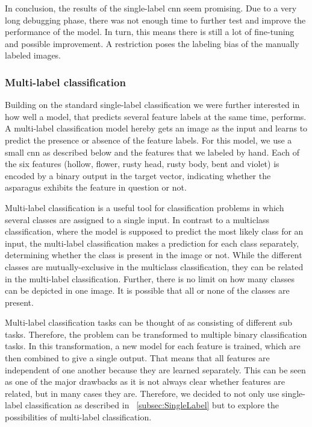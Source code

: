 \bigskip
In conclusion, the results of the single-label  \acrshort{cnn} seem promising. Due to a very long debugging phase, there was not enough time to further test and improve the performance of the model. In turn, this means there is still a lot of fine-tuning and possible improvement. A restriction poses the labeling bias of the manually labeled images.

\subsubsection{Multi-label classification}
\label{subsec:MultiLabel}

Building on the standard single-label classification we were further interested in how well a model, that predicts several feature labels at the same time, performs. A multi-label classification model hereby gets an image as the input and learns to predict the presence or absence of  the feature labels.
For this model, we use a small  \acrshort{cnn} as described below and the features that we labeled by hand. Each of the six features (hollow, flower, rusty head, rusty body, bent and violet) is encoded by a binary output in the target vector, indicating whether the asparagus exhibits the feature in question or not.

\bigskip
Multi-label classification is a useful tool for classification problems in which several classes are assigned to a single input. In contrast to a multiclass classification, where the model is supposed to predict the most likely class for an input, the multi-label classification makes a prediction for each class separately, determining whether the class is present in the image or not. While the different classes are mutually-exclusive in the multiclass classification, they can be related in the multi-label classification. Further, there is no limit on how many classes can be depicted in one image. It is possible that all or none of the classes are present.

Multi-label classification tasks can be thought of as consisting of different sub tasks. Therefore, the problem can be transformed to multiple binary classification tasks. In this transformation, a new model for each feature is trained, which are then combined to give a single output. That means that all features are independent of one another because they are learned separately. This can be seen as one of the major drawbacks as it is not always clear whether features are related, but in many cases they are.
Therefore, we decided to not only use single-label classification as described in ~\autoref{subsec:SingleLabel} but to explore the possibilities of multi-label classification.

